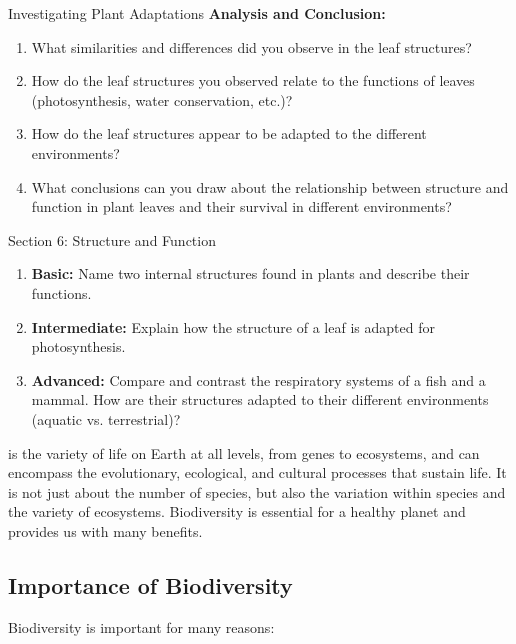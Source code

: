 \begin{investigation}{Investigating Plant Adaptations}
\textbf{Analysis and Conclusion:}
\begin{enumerate}
    \item What similarities and differences did you observe in the leaf structures?
    \item How do the leaf structures you observed relate to the functions of leaves (photosynthesis, water conservation, etc.)?
    \item How do the leaf structures appear to be adapted to the different environments?
    \item What conclusions can you draw about the relationship between structure and function in plant leaves and their survival in different environments?
\end{enumerate}
\end{investigation}


\begin{tieredquestions}{Section 6: Structure and Function}
\begin{enumerate}
    \item \textbf{Basic:} Name two internal structures found in plants and describe their functions.
    \item \textbf{Intermediate:} Explain how the structure of a leaf is adapted for photosynthesis.
    \item \textbf{Advanced:}  Compare and contrast the respiratory systems of a fish and a mammal. How are their structures adapted to their different environments (aquatic vs. terrestrial)?
\end{enumerate}
\end{tieredquestions}


\FloatBarrier
\1

 is the variety of life on Earth at all levels, from genes to ecosystems, and can encompass the evolutionary, ecological, and cultural processes that sustain life. It is not just about the number of species, but also the variation within species and the variety of ecosystems.  Biodiversity is essential for a healthy planet and provides us with many benefits.

\subsection{Importance of Biodiversity}

Biodiversity is important for many reasons:

